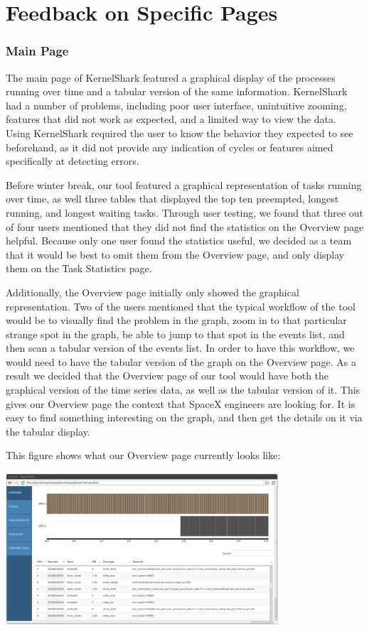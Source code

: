 \documentclass{hmcclinic}
\begin{document}
\section{Feedback on Specific Pages} %

\subsubsection{Main Page}

The main page of KernelShark featured a graphical display of the processes
running over time and a tabular version of the same information. KernelShark had
a number of problems, including poor user interface, unintuitive zooming,
features that did not work as expected, and a limited way to view the data.
Using KernelShark required the user to know the behavior they expected to see
beforehand, as it did not provide any indication of cycles or features aimed
specifically at detecting errors.

Before winter break, our tool featured a graphical representation of tasks running over time,
as well three tables that displayed the top ten preempted, longest running, and
longest waiting tasks. 
Through user testing, we found that three out of four users mentioned that they
did not find the statistics on the Overview page helpful. Because only one user found the statistics useful,
we decided as a team that it would be best to omit them from the Overview page, and
only display them on the Task Statistics page.

Additionally, the Overview page initially only showed the graphical
representation. Two of the users mentioned that the typical workflow of the tool
would be to visually find the problem in the graph, zoom in to that particular
strange spot in the graph, be able to jump to that spot in the events list, and
then scan a tabular version of the events list. In order to have this workflow,
we would need to have the tabular version of the graph on the Overview page.
As a result we decided that the Overview page of our tool would have both the
graphical version of the time series data, as well as the tabular version of it.
This gives our Overview page the context that SpaceX engineers are looking for.
It is easy to find something interesting on the graph, and then get the details
on it via the tabular display.

This figure shows what our Overview page currently looks like:
\begin{center}
\includegraphics[width=4in]{overview-page.png}
\end{center}
\end{document}
